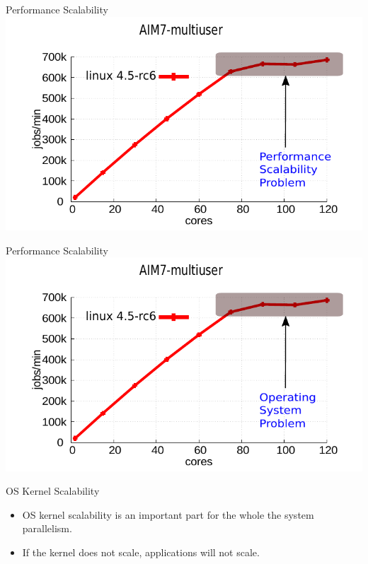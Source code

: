 \documentclass[english]{beamer} %
\begin{document}
\begin{frame}{Performance Scalability}
\includegraphics[scale=0.8]{graph/aim7_default_2}
\end{frame}

\begin{frame}{Performance Scalability}
\includegraphics[scale=0.8]{graph/aim7_default_3}
\end{frame}

\begin{frame}{OS Kernel Scalability}
    \begin{itemize}[<+-| alert@+>]
    \item OS kernel scalability is an important part for the whole the system
    parallelism.
    \item If the kernel does not scale, applications will not scale.
    \end{itemize}
\end{frame}
\end{document}
